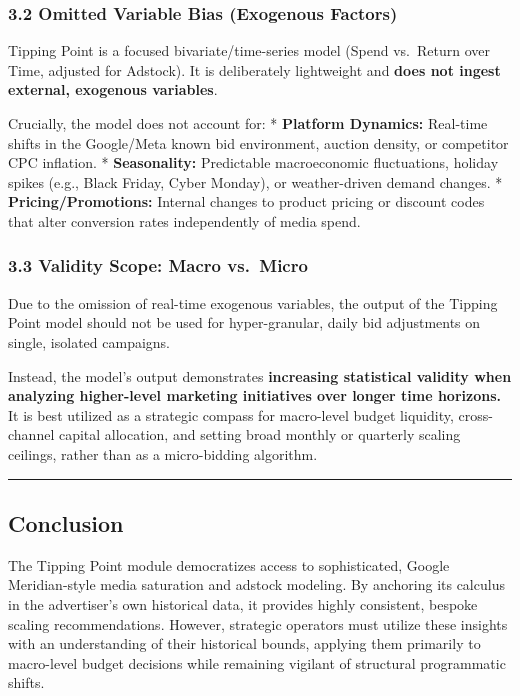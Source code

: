 \documentclass[
]{article}
\begin{document}
\subsubsection{3.2 Omitted Variable Bias (Exogenous
Factors)}\label{omitted-variable-bias-exogenous-factors}

Tipping Point is a focused bivariate/time-series model (Spend vs.~Return
over Time, adjusted for Adstock). It is deliberately lightweight and
\textbf{does not ingest external, exogenous variables}.

Crucially, the model does not account for: * \textbf{Platform Dynamics:}
Real-time shifts in the Google/Meta known bid environment, auction
density, or competitor CPC inflation. * \textbf{Seasonality:}
Predictable macroeconomic fluctuations, holiday spikes (e.g., Black
Friday, Cyber Monday), or weather-driven demand changes. *
\textbf{Pricing/Promotions:} Internal changes to product pricing or
discount codes that alter conversion rates independently of media spend.

\subsubsection{3.3 Validity Scope: Macro
vs.~Micro}\label{validity-scope-macro-vs.-micro}

Due to the omission of real-time exogenous variables, the output of the
Tipping Point model should not be used for hyper-granular, daily bid
adjustments on single, isolated campaigns.

Instead, the model's output demonstrates \textbf{increasing statistical
validity when analyzing higher-level marketing initiatives over longer
time horizons.} It is best utilized as a strategic compass for
macro-level budget liquidity, cross-channel capital allocation, and
setting broad monthly or quarterly scaling ceilings, rather than as a
micro-bidding algorithm.

\begin{center}\rule{0.5\linewidth}{0.5pt}\end{center}

\subsection{Conclusion}\label{conclusion}

The Tipping Point module democratizes access to sophisticated, Google
Meridian-style media saturation and adstock modeling. By anchoring its
calculus in the advertiser's own historical data, it provides highly
consistent, bespoke scaling recommendations. However, strategic
operators must utilize these insights with an understanding of their
historical bounds, applying them primarily to macro-level budget
decisions while remaining vigilant of structural programmatic shifts.
\end{document}
